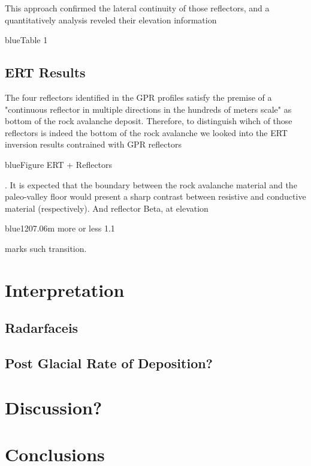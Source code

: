 \documentclass[5p]{elsarticle}
\newcommand{\COMON}{\begin{color}{blue}}
\newcommand{\COMOFF}{\end{color}}
\begin{document}
This approach confirmed the lateral continuity of those reflectors, and  a quantitatively analysis reveled their elevation information\COMON Table 1 \COMOFF
	

    \subsection {ERT Results}

The four reflectors identified in the GPR profiles satisfy the premise of a "continuous reflector in multiple directions in the hundreds of meters scale" as bottom of the rock avalanche deposit. Therefore, to distinguish wihch of those reflectors is indeed the bottom of the rock avalanche we looked into the ERT inversion results contrained with GPR reflectors \COMON Figure ERT + Reflectors \COMOFF. It is expected that the boundary between the rock avalanche material and the paleo-valley floor would present a sharp contrast between resistive and conductive material (respectively). And reflector Beta, at elevation \COMON 1207.06m more or less 1.1  \COMOFF marks such transition. 

										
\section{Interpretation}

    \subsection{Radarfaceis}


    \subsection{Post Glacial Rate of Deposition?}
    
		
										
				
				
										
\section{Discussion?}
										
										
										
										
										
\section{Conclusions}





\end{document}
